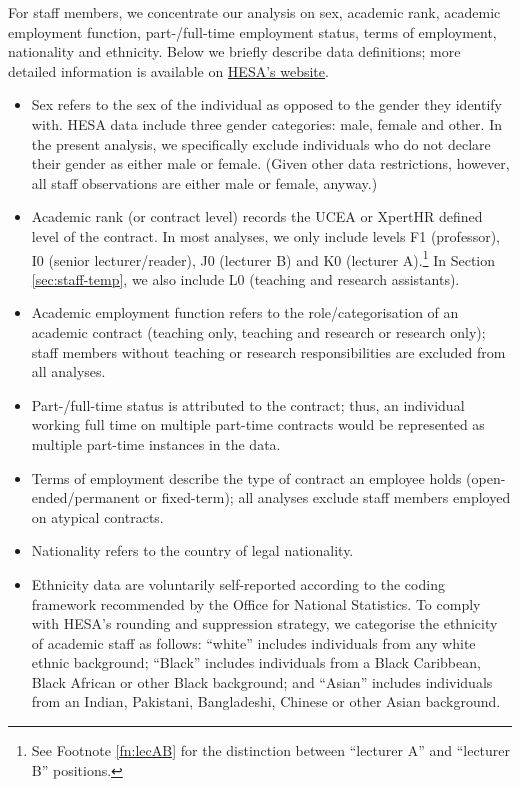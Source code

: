 \documentclass[a4paper, 1]{article}
\begin{document}
For staff members, we concentrate our analysis on sex, academic rank, academic employment function, part-/full-time employment status, terms of employment, nationality and ethnicity. Below we briefly describe data definitions; more detailed information is available on \href{https://www.hesa.ac.uk/support/definitions/staff}{HESA's website}.

\begin{itemize}
\item
  Sex refers to the sex of the individual as opposed to the gender they identify with. HESA data include three gender categories: male, female and other. In the present analysis, we specifically exclude individuals who do not declare their gender as either male or female. (Given other data restrictions, however, all staff observations are either male or female, anyway.)
\item
  Academic rank (or contract level) records the UCEA or XpertHR defined level of the contract. In most analyses, we only include levels F1 (professor), I0 (senior lecturer/reader), J0 (lecturer B) and K0 (lecturer A).\footnote{See Footnote \ref{fn:lecAB} for the distinction between ``lecturer A'' and ``lecturer B'' positions.} In Section \ref{sec:staff-temp}, we also include L0 (teaching and research assistants).
\item
  Academic employment function refers to the role/categorisation of an academic contract (teaching only, teaching and research or research only); staff members without teaching or research responsibilities are excluded from all analyses.
\item
  Part-/full-time status is attributed to the contract; thus, an individual working full time on multiple part-time contracts would be represented as multiple part-time instances in the data.
\item
  Terms of employment describe the type of contract an employee holds (open-ended/permanent or fixed-term); all analyses exclude staff members employed on atypical contracts.
\item
  Nationality refers to the country of legal nationality.
\item
  Ethnicity data are voluntarily self-reported according to the coding framework recommended by the Office for National Statistics. To comply with HESA's rounding and suppression strategy, we categorise the ethnicity of academic staff as follows: ``white'' includes individuals from any white ethnic background; ``Black'' includes individuals from a Black Caribbean, Black African or other Black background; and ``Asian'' includes individuals from an Indian, Pakistani, Bangladeshi, Chinese or other Asian background.
\end{itemize}
\end{document}
